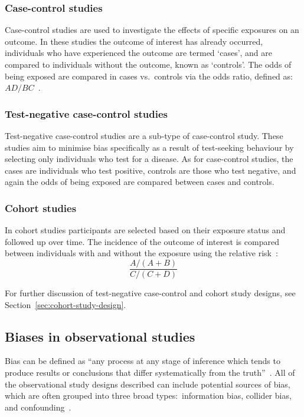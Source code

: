 \subsubsection{Case-control studies}

Case-control studies are used to investigate the effects of specific exposures on an outcome. In these studies the outcome of interest has already occurred, individuals who have experienced the outcome are termed `cases', and are compared to individuals without the outcome, known as `controls'. The odds of being exposed are compared in cases vs.\ controls via the odds ratio, defined as:\ $AD/BC$~\parencite{Woodward2013-ef}.

\subsubsection{Test-negative case-control studies}

Test-negative case-control studies are a sub-type of case-control study. These studies aim to minimise bias specifically as a result of test-seeking behaviour by selecting only individuals who test for a disease. As for case-control studies, the cases are individuals who test positive, controls are those who test negative, and again the odds of being exposed are compared between cases and controls.

\subsubsection{Cohort studies}

In cohort studies participants are selected based on their exposure status and followed up over time. The incidence of the outcome of interest is compared between individuals with and without the exposure using the relative risk~\parencite{Woodward2013-ef}:
%
\[
    \frac{A/(A+B)}{C/(C+D)}
\]

For further discussion of test-negative case-control and cohort study designs, see Section~\ref{sec:cohort-study-design}.

\subsection{Biases in observational studies}\label{sec:observational-bias}

Bias can be defined as ``any process at any stage of inference which tends to produce results or conclusions that differ systematically from the truth''~\parencite{Sackett1979-xy}. All of the observational study designs described can include potential sources of bias, which are often grouped into three broad types:\ information bias, collider bias, and confounding~\parencite{Hernan2023-de}.


